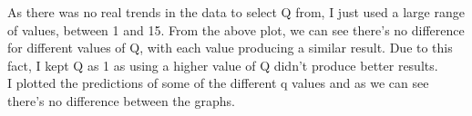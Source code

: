 \documentclass[11pt]{article} %
\begin{document}
As there was no real trends in the data to select Q from, I just used a large range of values, between 1 and 15. From the above plot, we can see there's no difference for different values of Q, with each value producing a similar result. Due to this fact, I kept Q as 1 as using a higher value of Q didn't produce better results. \\
I plotted the predictions of some of the different q values and as we can see there's no difference between the graphs.
\begin{figure}[h]
\centering
{}
\qquad
{}
\qquad
{}
\qquad
\end{figure}
\clearpage
\end{document}
